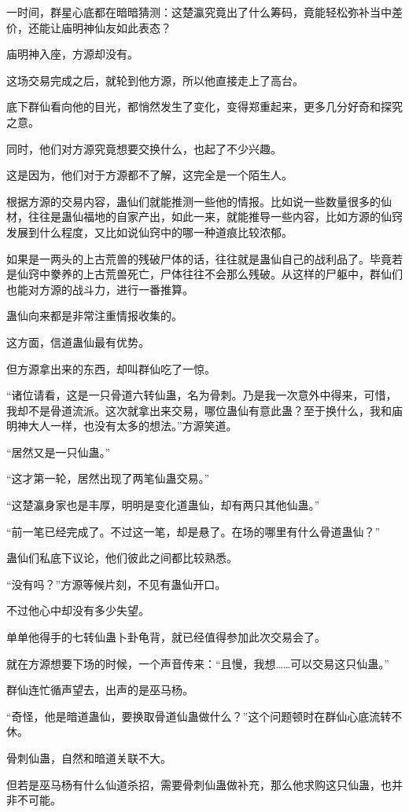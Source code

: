 \begin{this_body}
一时间，群星心底都在暗暗猜测：这楚瀛究竟出了什么筹码，竟能轻松弥补当中差价，还能让庙明神仙友如此表态？

庙明神入座，方源却没有。

这场交易完成之后，就轮到他方源，所以他直接走上了高台。

底下群仙看向他的目光，都悄然发生了变化，变得郑重起来，更多几分好奇和探究之意。

同时，他们对方源究竟想要交换什么，也起了不少兴趣。

这是因为，他们对于方源都不了解，这完全是一个陌生人。

根据方源的交易内容，蛊仙们就能推测一些他的情报。比如说一些数量很多的仙材，往往是蛊仙福地的自家产出，如此一来，就能推导一些内容，比如方源的仙窍发展到什么程度，又比如说仙窍中的哪一种道痕比较浓郁。

如果是一两头的上古荒兽的残破尸体的话，往往就是蛊仙自己的战利品了。毕竟若是仙窍中豢养的上古荒兽死亡，尸体往往不会那么残破。从这样的尸躯中，群仙们也能对方源的战斗力，进行一番推算。

蛊仙向来都是非常注重情报收集的。

这方面，信道蛊仙最有优势。

但方源拿出来的东西，却叫群仙吃了一惊。

“诸位请看，这是一只骨道六转仙蛊，名为骨刺。乃是我一次意外中得来，可惜，我却不是骨道流派。这次就拿出来交易，哪位蛊仙有意此蛊？至于换什么，我和庙明神大人一样，也没有太多的想法。”方源笑道。

“居然又是一只仙蛊。”

“这才第一轮，居然出现了两笔仙蛊交易。”

“这楚瀛身家也是丰厚，明明是变化道蛊仙，却有两只其他仙蛊。”

“前一笔已经完成了。不过这一笔，却是悬了。在场的哪里有什么骨道蛊仙？”

蛊仙们私底下议论，他们彼此之间都比较熟悉。

“没有吗？”方源等候片刻，不见有蛊仙开口。

不过他心中却没有多少失望。

单单他得手的七转仙蛊卜卦龟背，就已经值得参加此次交易会了。

就在方源想要下场的时候，一个声音传来：“且慢，我想……可以交易这只仙蛊。”

群仙连忙循声望去，出声的是巫马杨。

“奇怪，他是暗道蛊仙，要换取骨道仙蛊做什么？”这个问题顿时在群仙心底流转不休。

骨刺仙蛊，自然和暗道关联不大。

但若是巫马杨有什么仙道杀招，需要骨刺仙蛊做补充，那么他求购这只仙蛊，也并非不可能。


\end{this_body}
